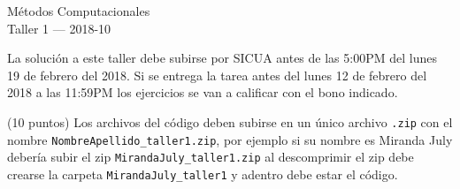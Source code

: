 \documentclass[11pt,letterpaper]{exam}
\begin{document}
\begin{center}
{\Large Métodos Computacionales} \\
Taller 1 --- 2018-10\\

\end{center}



\vspace{0.3cm}

\noindent
La solución a este taller debe subirse por SICUA antes de las 5:00PM
del lunes 19 de febrero del 2018. 
Si se entrega la tarea antes del lunes 12 de febrero del 2018 a las
11:59PM los ejercicios se van a calificar con el bono indicado. 
\noindent

\vspace{0.3cm}
(10 puntos) Los archivos del c\'odigo  deben subirse en un
\'unico archivo \verb".zip" con el nombre
\verb"NombreApellido_taller1.zip", por ejemplo si su nombre es Miranda
July deber\'ia subir el zip
\verb"MirandaJuly_taller1.zip" al descomprimir el zip debe crearse la
carpeta \verb"MirandaJuly_taller1" y adentro debe estar el c\'odigo.
\end{document}
